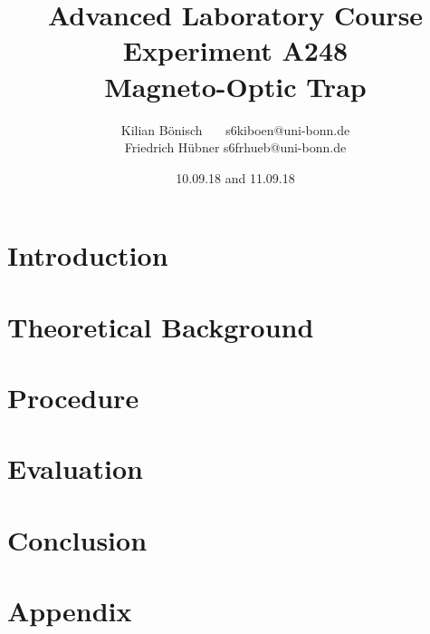 \documentclass{article}
\begin{document}
\setlength{\parindent}{0em}   %
\title{Advanced Laboratory Course\\Experiment A248\\Magneto-Optic Trap}
\author{Kilian Bönisch \ \ \ \qquad s6kiboen@uni-bonn.de \\
  Friedrich Hübner \qquad s6frhueb@uni-bonn.de }
\date{10.09.18 and 11.09.18}

\maketitle
\thispagestyle{empty}

\newpage

\thispagestyle{empty}

\tableofcontents

\newpage

\section{Introduction}



\section{Theoretical Background}



\section{Procedure}



\section{Evaluation}



\section{Conclusion}



\FloatBarrier

\newpage

\printbibliography

\newpage

\section{Appendix}

\end{document}
